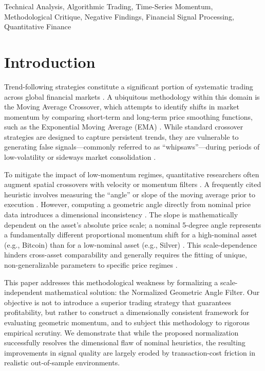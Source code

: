 \documentclass[conference]{IEEEtran}
\begin{document}
\begin{IEEEkeywords}
Technical Analysis, Algorithmic Trading, Time-Series Momentum, Methodological Critique, Negative Findings, Financial Signal Processing, Quantitative Finance
\end{IEEEkeywords}

\section{Introduction}
Trend-following strategies constitute a significant portion of systematic trading across global financial markets \cite{lo2000}. A ubiquitous methodology within this domain is the Moving Average Crossover, which attempts to identify shifts in market momentum by comparing short-term and long-term price smoothing functions, such as the Exponential Moving Average (EMA) \cite{brock1992}. While standard crossover strategies are designed to capture persistent trends, they are vulnerable to generating false signals---commonly referred to as ``whipsaws''---during periods of low-volatility or sideways market consolidation \cite{hsu2016}.

To mitigate the impact of low-momentum regimes, quantitative researchers often augment spatial crossovers with velocity or momentum filters \cite{osler2003}. A frequently cited heuristic involves measuring the ``angle'' or slope of the moving average prior to execution \cite{murphy1999}. However, computing a geometric angle directly from nominal price data introduces a dimensional inconsistency \cite{bauer1998}. The slope is mathematically dependent on the asset's absolute price scale; a nominal 5-degree angle represents a fundamentally different proportional momentum shift for a high-nominal asset (e.g., Bitcoin) than for a low-nominal asset (e.g., Silver) \cite{harvey2016}. This scale-dependence hinders cross-asset comparability and generally requires the fitting of unique, non-generalizable parameters to specific price regimes \cite{deprado2018}.

This paper addresses this methodological weakness by formalizing a scale-independent mathematical solution: the Normalized Geometric Angle Filter. Our objective is not to introduce a superior trading strategy that guarantees profitability, but rather to construct a dimensionally consistent framework for evaluating geometric momentum, and to subject this methodology to rigorous empirical scrutiny. We demonstrate that while the proposed normalization successfully resolves the dimensional flaw of nominal heuristics, the resulting improvements in signal quality are largely eroded by transaction-cost friction in realistic out-of-sample environments.
\end{document}

